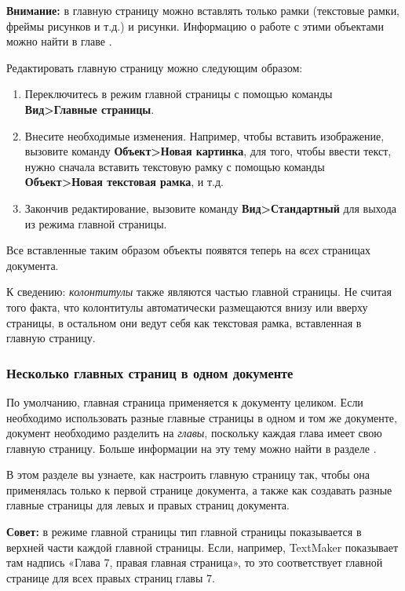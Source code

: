 ﻿\documentclass[a4paper,10pt]{article}
\begin{document}
\begin{mdframed}[backgroundcolor=blue!10]
\textbf{Внимание:} в главную страницу можно вставлять только рамки (текстовые рамки, фреймы рисунков и т.д.) и рисунки. Информацию о работе с этими объектами можно найти в главе .
\end{mdframed}

Редактировать главную страницу можно следующим образом:
\begin{enumerate}
 \item Переключитесь в режим главной страницы с помощью команды \textbf{Вид>Главные страницы}.
 \item Внесите необходимые изменения. Например, чтобы вставить изображение, вызовите команду \textbf{Объект>Новая картинка}, для того, чтобы ввести текст, нужно сначала вставить текстовую рамку с помощью команды \textbf{Объект>Новая текстовая рамка}, и т.д.
 \item Закончив редактирование, вызовите команду \textbf{Вид>Стандартный} для выхода из режима главной страницы.
\end{enumerate}

Все вставленные таким образом объекты появятся теперь на \textit{всех} страницах документа.

К сведению: \textit{колонтитулы} также являются частью главной страницы. Не считая того факта, что колонтитулы автоматически размещаются внизу или вверху страницы, в остальном они ведут себя как текстовая рамка, вставленная в главную страницу.

\subsubsection{Несколько главных страниц в одном документе}
По умолчанию, главная страница применяется к документу целиком. Если необходимо использовать разные главные страницы в одном и том же документе, документ необходимо разделить на \textit{главы}, поскольку каждая глава имеет свою главную страницу. Больше информации на эту тему можно найти в разделе .

В этом разделе вы узнаете, как настроить главную страницу так, чтобы она применялась только к первой странице документа, а также как создавать разные главные страницы для левых и правых страниц документа.

\begin{mdframed}[backgroundcolor=blue!10]
\textbf{Совет:} в режиме главной страницы тип главной страницы показывается в верхней части каждой главной страницы. Если, например, TextMaker показывает там надпись «Глава 7, правая главная страница», то это соответствует главной странице для всех правых страниц главы 7.
\end{mdframed}
\end{document}

